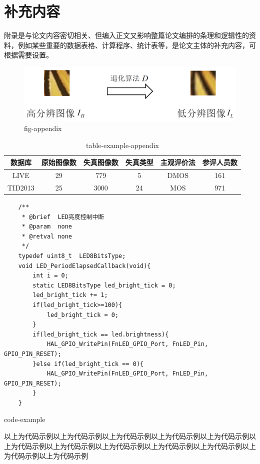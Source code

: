 \chapter{补充内容}

附录是与论文内容密切相关、但编入正文又影响整篇论文编排的条理和逻辑性的资料，例如某些重要的数据表格、计算程序、统计表等，是论文主体的补充内容，可根据需要设置。

\begin{figure}[h]
  \centering
  \includegraphics[width=0.42\linewidth]{./content/test.png}
  \caption{fig-appendix}
  \label{fig:fig-appendix}
\end{figure}

\begin{table}[h]
  \centering
  \caption{table-example-appendix}
  \begin{tabular}{cccccc}
    \toprule
    数据库  & 原始图像数 & 失真图像数 & 失真类型 & 主观评价法 & 参评人员数 \\
    \midrule
    LIVE    & 29         & 779        & 5       & DMOS       & 161        \\
    TID2013 & 25         & 3000       & 24      & MOS        & 971        \\
    \bottomrule
  \end{tabular}
  \label{tab:table-example-appendix}
\end{table}

\begin{listing}[h]
  \begin{verbatim}
    /**
     * @brief  LED亮度控制中断
     * @param  none
     * @retval none
     */
    typedef uint8_t  LED8BitsType;
    void LED_PeriodElapsedCallback(void){
        int i = 0;
        static LED8BitsType led_bright_tick = 0;
        led_bright_tick += 1;
        if(led_bright_tick>=100){
            led_bright_tick = 0;
        }
        if(led_bright_tick == led.brightness){
            HAL_GPIO_WritePin(FnLED_GPIO_Port, FnLED_Pin, GPIO_PIN_RESET);
        }else if(led_bright_tick == 0){
            HAL_GPIO_WritePin(FnLED_GPIO_Port, FnLED_Pin, GPIO_PIN_RESET);
        }
    }
    \end{verbatim}
    \caption{code-example}
    \label{listing:example}
\end{listing}

以上为代码示例以上为代码示例以上为代码示例以上为代码示例以上为代码示例以上为代码示例以上为代码示例以上为代码示例以上为代码示例以上为代码示例以上为代码示例以上为代码示例